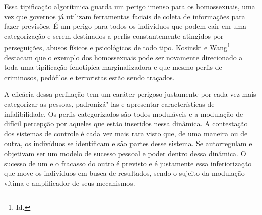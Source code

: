 Essa tipificação algorítmica guarda um perigo imenso para os
homossexuais, uma vez que governos já utilizam ferramentas faciais de
coleta de informações para fazer previsões. É um perigo para todos os
indivíduos que podem cair em uma categorização e serem destinados a
perfis constantemente atingidos por perseguições, abusos físicos e
psicológicos de todo tipo. Kosinski e Wang\footnote{Id.} destacam que o exemplo
dos homossexuais pode ser novamente direcionado a toda uma tipificação
fenotípica marginalizadora e que mesmo perfis de criminosos, pedófilos e
terroristas estão sendo traçados.

A eficácia dessa perfilação tem um caráter perigoso justamente por cada
vez mais categorizar as pessoas, padronizá"-las e apresentar
características de infalibilidade. Os perfis categorizados são todos
moduláveis e a modulação de difícil percepção por aqueles que estão
inseridos nessa dinâmica. A contestação dos sistemas de controle é cada
vez mais rara visto que, de uma maneira ou de outra, os indivíduos se
identificam e são partes desse sistema. Se autorregulam e objetivam ser
um modelo de sucesso pessoal e poder dentro dessa dinâmica. O sucesso de
um e o fracasso do outro é previsto e é justamente essa inferiorização
que move os indivíduos em busca de resultados, sendo o sujeito da
modulação vítima e amplificador de seus mecanismos.


